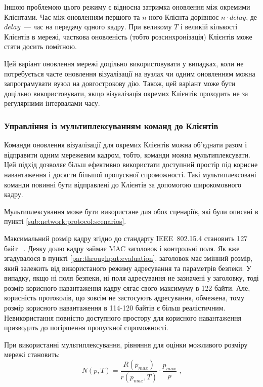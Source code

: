 \documentclass[a4paper,ukrainian,utf8,nocolumnsxix,nocolumnxxxii,nocolumnxxxi,floatsection,equationsection]{eskdtext}
\renewcommand\paragraph{\subsubsection}
\newcommand{\iee}[0]{IEEE~802.15.4\xspace}
\begin{document}
Іншою проблемою цього режиму є відносна затримка оновлення між окремими Клієнтами. Час між оновленням першого та $n$-ного Клієнта дорівнює $n \cdot delay$, де $delay$~--- час на передачу одного кадру. При великому $T$ і великій кількості Клієнтів в мережі, часткова оновленість (тобто розсинхронізація) Клієнтів може стати досить помітною.

Цей варіант оновлення мережі доцільно використовувати у випадках, коли не потребується часте оновлення візуалізації на вузлах чи одним оновленням можна запрограмувати вузол на довгострокову дію. Також, цей варіант може бути доцільно використовувати, якщо візуалізація окремих Клієнтів проходить не за регулярними інтервалами часу.

\paragraph{Управління із мультиплексуванням команд до Клієнтів}

Команди оновлення візуалізації для окремих Клієнтів можна об'єднати разом і відправити одним мережевим кадром, тобто, команди можна мультиплексувати. Цей підхід дозволяє більш ефективно використати доступний простір під корисне навантаження і досягти більшої пропускної спроможності. Такі мультиплексовані команди повинні бути відправлені до Клієнтів за допомогою широкомовного кадру.

Мультиплексування може бути використане для обох сценаріїв, які були описані в пункті \ref{sub:network:protocol:scenarios}.

Максимальний розмір кадру згідно до стандарту \iee становить 127 байт ~\cite{ieee:802:15:4:2011}. Деяку долю кадру займає MAC заголовок і контрольні поля. Як вже згадувалося в пункті \ref{par:throughput:evaluation}, заголовок має змінний розмір, який залежить від використаного режиму адресування та параметрів безпеки. У випадку, якщо ні поля безпеки, ні поля адресування не зазначені у заголовку, тоді розмір корисного навантаження кадру сягає свого максимуму в 122 байти. Але, корисність протоколів, що зовсім не застосують адресування, обмежена, тому розмір корисного навантаження в 114-120 байтів є більш реалістичним. Невикористання повністю доступного простору для корисного навантаження призводить до погіршення пропускної спроможності.

При використанні мультиплексування, рівняння для оцінки можливого розміру мережі становить:
\begin{equation}\label{eq:net:size:multiplex:send}
	N(p, T) = \frac{R(p_{max})}{r(p_{max}, T)} \cdot \frac{p_{max}}{p} \text{ ,}
\end{equation}
\end{document}
